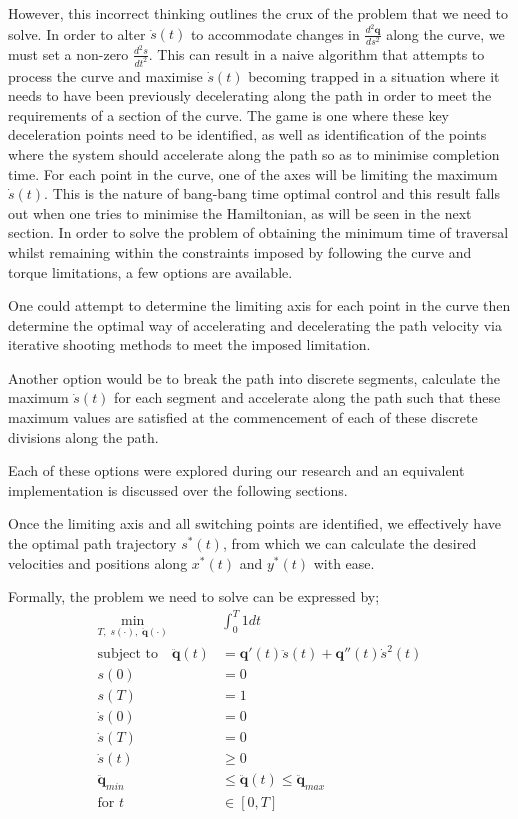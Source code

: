 However, this incorrect thinking outlines the crux of the problem that we need to solve. In order to alter $\dot{s}(t)$  to accommodate changes in $\frac{d^2\textbf{q}}{ds^2}$ along the curve, we must set a non-zero $\frac{d^2s}{dt^2}$. This can result in a naive algorithm that attempts to process the curve and maximise $\dot{s}(t)$ becoming trapped in a situation where it needs to have been previously decelerating along the path in order to meet the requirements of a section of the curve. The game is one where these key deceleration points need to be identified, as well as identification of the points where the system should accelerate along the path so as to minimise completion time.
For each point in the curve, one of the axes will be limiting the maximum $\dot{s}(t)$. This is the nature of bang-bang time optimal control and this result falls out when one tries to minimise the Hamiltonian, as will be seen in the next section.
In order to solve the problem of obtaining the minimum time of traversal whilst remaining within the constraints imposed by following the curve and torque limitations, a few options are available.

One could attempt to determine the limiting axis for each point in the curve then determine the optimal way of accelerating and decelerating the path velocity via iterative shooting methods to meet the imposed limitation.

Another option would be to break the path into discrete segments, calculate the maximum $\dot{s}(t)$ for each segment and accelerate along the path such that these maximum values are satisfied at the commencement of each of these discrete divisions along the path.

Each of these options were explored during our research and an equivalent implementation is discussed over the following sections.

Once the limiting axis and all switching points are identified, we effectively have the optimal path trajectory $s^*(t)$, from which we can calculate the desired velocities and positions along $x^*(t)$ and $y^	*(t)$ with ease.

Formally, the problem we need to solve can be expressed by;
\begin{align*}
\min_{T, \; s(\cdot), \; \ddot{\textbf{q}}(\cdot)} \;& \int_0^T1dt\\
\text{subject to} \quad \ddot{\textbf{q}}(t) &= \textbf{q}'(t)\ddot{s}(t) + \textbf{q}''(t)\dot{s}^2(t)\\
s(0) &= 0\\
s(T) &= 1\\
\dot{s}(0) &= 0\\
\dot{s}(T) &= 0\\
\dot{s}(t) &\geq 0\\
\ddot{\textbf{q}}_{min} &\leq \ddot{\textbf{q}}(t) \leq \ddot{\textbf{q}}_{max}\\
\text{for } t &\in [0,T]\\
\end{align*}